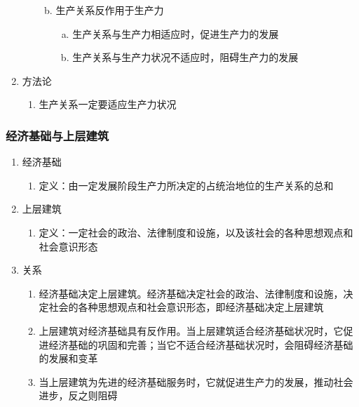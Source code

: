 \documentclass[12pt]{book}
\begin{document}
\begin{enumerate}[1.]
\begin{enumerate}[(1)]
\begin{enumerate}[a.]
\begin{enumerate}[(a)]
                          \end{enumerate}
                    \item  生产关系反作用于生产力
                          \begin{enumerate}[(a)]
                            \item 生产关系与生产力相适应时，促进生产力的发展
                            \item 生产关系与生产力状况不适应时，阻碍生产力的发展
                          \end{enumerate}
                  \end{enumerate}
          \end{enumerate}
    \item 方法论
    \begin{enumerate}[(1)]
        \item 生产关系一定要适应生产力状况
    \end{enumerate}
\end{enumerate}
  

\subsubsection{经济基础与上层建筑}



\begin{enumerate}[1.]
    \item 经济基础
          \begin{enumerate}[(1)]
            \item 定义：由一定发展阶段生产力所决定的占统治地位的生产关系的总和
          \end{enumerate}
    \item 上层建筑
          \begin{enumerate}[(1)]
            \item 定义：一定社会的政治、法律制度和设施，以及该社会的各种思想观点和社会意识形态
          \end{enumerate}
    \item 关系
          \begin{enumerate}[(1)]
            \item 经济基础决定上层建筑。经济基础决定社会的政治、法律制度和设施，决定社会的各种思想观点和社会意识形态，即经济基础决定上层建筑
            \item 上层建筑对经济基础具有反作用。当上层建筑适合经济基础状况时，它促进经济基础的巩固和完善；当它不适合经济基础状况时，会阻碍经济基础的发展和变革
            \item 当上层建筑为先进的经济基础服务时，它就促进生产力的发展，推动社会进步，反之则阻碍
          \end{enumerate}
  \end{enumerate}
  
\end{document}
